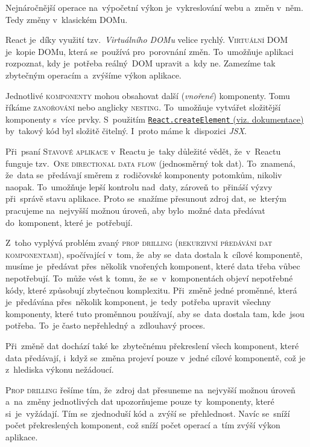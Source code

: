 \documentclass[14pt,a4paper]{article}
\begin{document}
        Nejnáročnější operace na~výpočetní výkon je~vykreslování webu a~změn v~něm. Tedy změny v~klasickém DOMu.

        React je~díky využití tzv.~\emph{Virtuálního DOMu} velice rychlý. \textsc{Virtuální DOM} je~kopie DOMu, která se~používá pro~porovnání změn. To~umožňuje aplikaci rozpoznat, kdy je~potřeba reálný~DOM upravit a~kdy ne. Zamezíme tak zbytečným operacím a~zvýšíme výkon aplikace. \cite{elrom2021react}

        Jednotlivé \textsc{komponenty} mohou obsahovat další (\emph{vnořené}) komponenty. Tomu říkáme \textsc{zanořování} nebo anglicky \textsc{nesting}. To~umožňuje vytvářet složitější komponenty s~více prvky.
        S~použitím \href{https://react.dev/reference/react/createElement}{\texttt{React.createElement} (viz. dokumentace)} by~takový kód byl složitě čitelný. I~proto máme k~dispozici \emph{JSX}.

        Při~psaní \textsc{Stavové aplikace} v~Reactu je~taky důležité vědět, že~v~Reactu funguje tzv.~\textsc{One directional data flow} (jednosměrný tok dat). To~znamená, že~data se~předávají směrem z~rodičovské komponenty potomkům, nikoliv naopak. To~umožňuje lepší kontrolu nad~daty, zároveň to~přináší výzvy při~správě stavu aplikace. Proto se~snažíme přesunout zdroj dat, se~kterým pracujeme na~nejvyšší možnou úroveň, aby bylo~možné data předávat do~komponent, které je~potřebují.
        
        Z~toho vyplývá problém zvaný \textsc{prop drilling} (\textsc{rekurzivní předávání dat komponentami}), spočívající v~tom, že~aby se~data dostala k~cílové komponentě, musíme je~předávat přes~několik vnořených komponent, které data třeba vůbec nepotřebují. To~může vést k~tomu, že~se~v~komponentách objeví nepotřebné kódy, které způsobují zbytečnou komplexitu. Při~změně jedné proměnné, která je~předávána přes~několik komponent, je~tedy~potřeba upravit všechny komponenty, které tuto proměnnou používají, aby se~data dostala tam, kde~jsou potřeba. To~je často nepřehledný a~zdlouhavý proces.
        
        Při~změně dat dochází také ke~zbytečnému překreslení všech komponent, které data předávají, i~když se~změna projeví pouze v~jedné cílové komponentě, což je z~hlediska výkonu nežádoucí.

        \textsc{Prop drilling} řešíme tím, že~zdroj dat přesuneme na~nejvyšší možnou úroveň a~na~změny jednotlivých dat upozorňujeme pouze ty~komponenty, které si~je~vyžádají. Tím se~zjednoduší kód a~zvýší se~přehlednost. Navíc se~sníží počet překreslených komponent, což sníží počet operací a~tím zvýší výkon aplikace.
        
\end{document}
